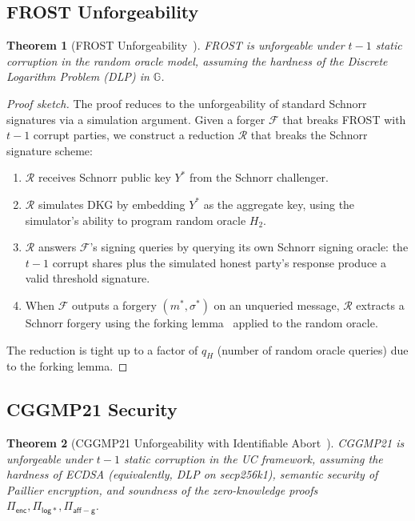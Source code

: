 \documentclass[11pt,twocolumn]{article}
\newtheorem{theorem}{Theorem}[section]
\begin{document}
\subsection{FROST Unforgeability}

\begin{theorem}[FROST Unforgeability~\cite{komlo2020frost}]
\label{thm:frost-uf}
FROST is unforgeable under $t{-}1$ static corruption in the random oracle model,
assuming the hardness of the Discrete Logarithm Problem (DLP) in $\mathbb{G}$.
\end{theorem}

\begin{proof}[Proof sketch]
The proof reduces to the unforgeability of standard Schnorr signatures via a
simulation argument. Given a forger $\mathcal{F}$ that breaks FROST with $t-1$
corrupt parties, we construct a reduction $\mathcal{R}$ that breaks the Schnorr
signature scheme:

\begin{enumerate}[nosep]
  \item $\mathcal{R}$ receives Schnorr public key $Y^*$ from the Schnorr challenger.
  \item $\mathcal{R}$ simulates DKG by embedding $Y^*$ as the aggregate key, using
    the simulator's ability to program random oracle $H_2$.
  \item $\mathcal{R}$ answers $\mathcal{F}$'s signing queries by querying its own
    Schnorr signing oracle: the $t-1$ corrupt shares plus the simulated honest
    party's response produce a valid threshold signature.
  \item When $\mathcal{F}$ outputs a forgery $(m^*, \sigma^*)$ on an unqueried
    message, $\mathcal{R}$ extracts a Schnorr forgery using the forking
    lemma~\cite{pointcheval1996} applied to the random oracle.
\end{enumerate}

The reduction is tight up to a factor of $q_H$ (number of random oracle queries) due
to the forking lemma.
\end{proof}

\subsection{CGGMP21 Security}

\begin{theorem}[CGGMP21 Unforgeability with Identifiable Abort~\cite{canetti2021cggmp}]
\label{thm:cggmp-uf}
CGGMP21 is unforgeable under $t{-}1$ static corruption in the UC framework,
assuming the hardness of ECDSA (equivalently, DLP on secp256k1), semantic security
of Paillier encryption, and soundness of the zero-knowledge proofs
$\Pi_{\mathsf{enc}}, \Pi_{\mathsf{log*}}, \Pi_{\mathsf{aff-g}}$.
\end{theorem}
\end{document}
